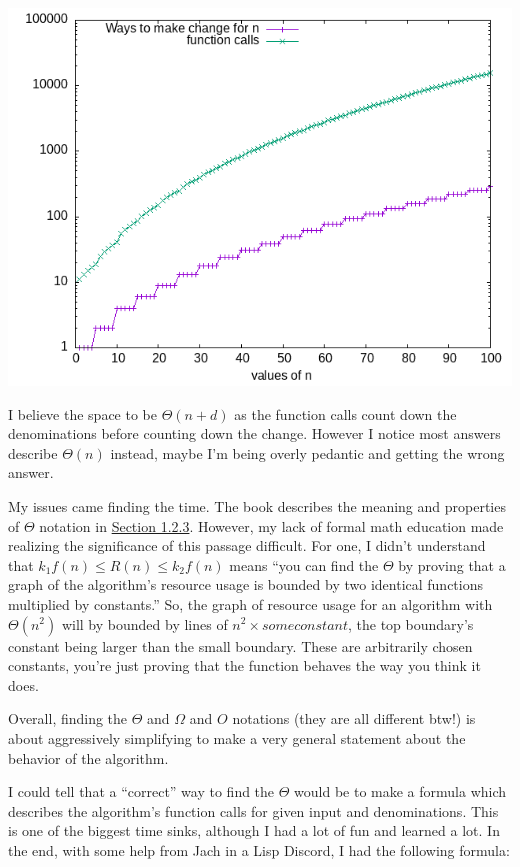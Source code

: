 \documentclass[final,fleqn,titlepage,twoside]{article}
\begin{document}
\begin{center}
\includegraphics[width=.9\linewidth]{1/fig/cc-100.png}
\end{center}

I believe the space to be \(\Theta(n+d)\) as the function calls count down the
denominations before counting down the change. However I notice most answers
describe \(\Theta(n)\) instead, maybe I'm being overly pedantic and getting the
wrong answer.

My issues came finding the time. The book describes the meaning and properties
of \(\Theta\) notation in \href{http://sarabander.github.io/sicp/html/1\_002e2.xhtml\#g\_t1\_002e2\_002e3}{Section 1.2.3}. However, my lack of formal math
education made realizing the significance of this passage difficult. For one, I
didn't understand that \(k_{1}f(n) \leq R(n) \leq k_{2}f(n)\) means ``you can
find the \(\Theta\) by proving that a graph of the algorithm's resource usage is
bounded by two identical functions multiplied by constants.'' So, the graph of
resource usage for an algorithm with \(\Theta(n^{2})\) will by bounded by lines
of \(n^{2} \times some constant\), the top boundary's constant being larger than
the small boundary. These are arbitrarily chosen constants, you're just proving
that the function behaves the way you think it does.

Overall, finding the \(\Theta\) and \(\Omega\) and \(O\) notations (they are all
different btw!) is about aggressively simplifying to make a very general
statement about the behavior of the algorithm.

I could tell that a ``correct'' way to find the \(\Theta\) would be to make a
formula which describes the algorithm's function calls for given input and
denominations. This is one of the biggest time sinks, although I had a lot of
fun and learned a lot. In the end, with some help from Jach in a Lisp Discord, I
had the following formula:
\end{document}
